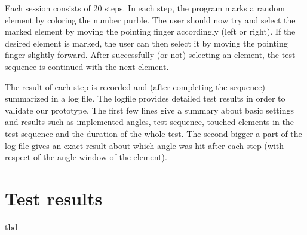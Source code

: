 \documentclass{sigchi-ext}
\begin{document}
Each session consists of 20 steps. In each step, the program marks a random element by coloring the number purble. The user should now try and select the marked element by moving the pointing finger accordingly (left or right). If the desired element is marked, the user can then select it by moving the pointing finger slightly forward. After successfully (or not) selecting an element, the test sequence is continued with the next element. \linebreak

The result of each step is recorded and (after completing the sequence) summarized in a log file. The logfile provides detailed test results in order to validate our prototype. The first few lines give a summary about basic settings and results such as implemented angles, test sequence, touched elements in the test sequence and the duration of the whole test. The second bigger a part of the log file gives an exact result about which angle was hit after each step (with respect of the angle window of the element).


\section{Test results}
tbd



\end{document}
